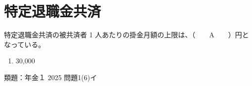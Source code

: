 \section{特定退職金共済}

\begin{fillblank}[年金1 2018 問題1(5)\textcircled{6}]
  特定退職金共済の被共済者 1 人あたりの掛金月額の上限は、（　　A　　）円となっている。
\end{fillblank}

\begin{answerbox}
  \begin{enumerate}[A:]
    \item 30,000
  \end{enumerate}
\end{answerbox}

\begin{explanationbox}
  類題：年金１ 2025 問題1(6)イ
\end{explanationbox}

\newpage